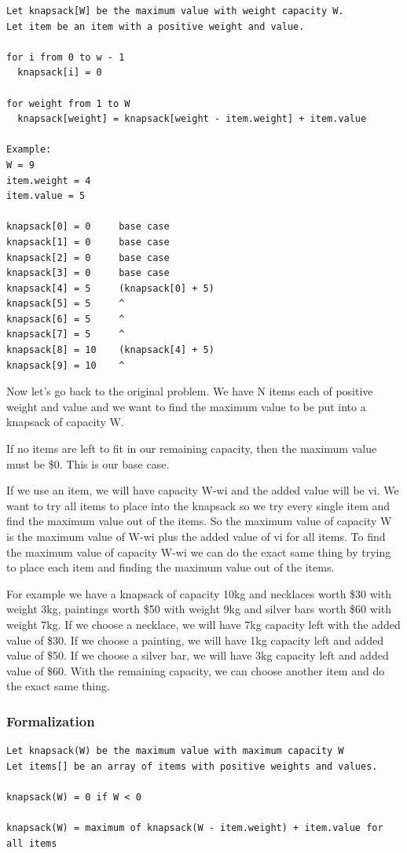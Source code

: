 \documentclass[11pt,oneside]{book}
\begin{document}
\begin{lstlisting}
Let knapsack[W] be the maximum value with weight capacity W.
Let item be an item with a positive weight and value.

for i from 0 to w - 1
  knapsack[i] = 0

for weight from 1 to W
  knapsack[weight] = knapsack[weight - item.weight] + item.value

Example:
W = 9
item.weight = 4
item.value = 5

knapsack[0] = 0     base case
knapsack[1] = 0     base case
knapsack[2] = 0     base case
knapsack[3] = 0     base case
knapsack[4] = 5     (knapsack[0] + 5)
knapsack[5] = 5     ^
knapsack[6] = 5     ^
knapsack[7] = 5     ^
knapsack[8] = 10    (knapsack[4] + 5)
knapsack[9] = 10    ^
\end{lstlisting}

Now let's go back to the original problem. We have N items each of positive weight and value and we want to find the maximum value to be put into a knapsack of capacity W.

If no items are left to fit in our remaining capacity, then the maximum value must be \$0. This is our base case.

If we use an item, we will have capacity W-wi and the added value will be vi. We want to try all items to place into the knapsack so we try every single item and find the maximum value out of the items. So the maximum value of capacity W is the maximum value of W-wi plus the added value of vi for all items. To find the maximum value of capacity W-wi we can do the exact same thing by trying to place each item and finding the maximum value out of the items.

For example we have a knapsack of capacity 10kg and necklaces worth \$30 with weight 3kg, paintings worth \$50 with weight 9kg and silver bars worth \$60 with weight 7kg. If we choose a necklace, we will have 7kg capacity left with the added value of \$30. If we choose a painting, we will have 1kg capacity left and added value of \$50. If we choose a silver bar, we will have 3kg capacity left and added value of \$60. With the remaining capacity, we can choose another item and do the exact same thing.

\subsubsection{Formalization}

\begin{lstlisting}
Let knapsack(W) be the maximum value with maximum capacity W
Let items[] be an array of items with positive weights and values.

knapsack(W) = 0 if W < 0

knapsack(W) = maximum of knapsack(W - item.weight) + item.value for all items
\end{lstlisting}
\end{document}
